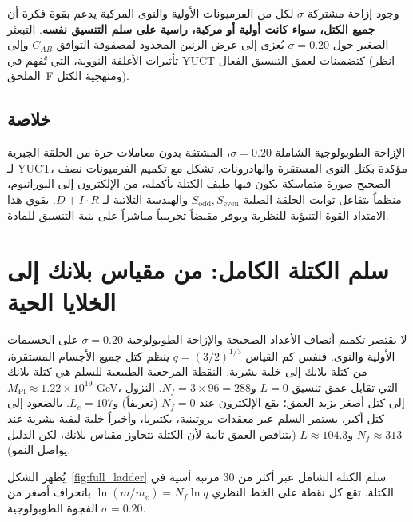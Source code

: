 \documentclass[12pt,a4paper]{article}
\begin{document}
	وجود إزاحة مشتركة \(\sigma\) لكل من الفرميونات الأولية والنوى المركبة يدعم بقوة فكرة أن \textbf{جميع الكتل، سواء كانت أولية أو مركبة، راسية على سلم التنسيق نفسه}. التبعثر الصغير حول \(\sigma=0.20\) يُعزى إلى عرض الرنين المحدود لمصفوفة التوافق \(C_{AB}\) وإلى تأثيرات الأغلفة النووية، التي تُفهم في YUCT كتضمينات لعمق التنسيق الفعال (انظر الملحق~F ومنهجية الكتل).
	
	\subsection{خلاصة}
	الإزاحة الطوبولوجية الشاملة \(\sigma = 0.20\)، المشتقة بدون معاملات حرة من الحلقة الجبرية لـ YUCT، مؤكدة بكتل النوى المستقرة والهادرونات. تشكل مع تكميم الفرميونات نصف الصحيح صورة متماسكة يكون فيها طيف الكتلة بأكمله، من الإلكترون إلى اليورانيوم، منظماً بتفاعل ثوابت الحلقة الصلبة \(S_{\mathrm{odd}}, S_{\mathrm{even}}\) والهندسة الثلاثية لـ \(D+I\cdot R\). يقوي هذا الامتداد القوة التنبؤية للنظرية ويوفر مقبضاً تجريبياً مباشراً على بنية التنسيق للمادة.
	
	\section{سلم الكتلة الكامل: من مقياس بلانك إلى الخلايا الحية}
	\label{sec:complete_ladder}
	
	لا يقتصر تكميم أنصاف الأعداد الصحيحة والإزاحة الطوبولوجية \(\sigma = 0.20\) على الجسيمات الأولية والنوى. فنفس كم القياس \(q = (3/2)^{1/3}\) ينظم كتل جميع الأجسام المستقرة، من كتلة بلانك إلى خلية بشرية. النقطة المرجعية الطبيعية للسلم هي كتلة بلانك \(M_{\mathrm{Pl}} \approx 1.22 \times 10^{19}\) GeV، التي تقابل عمق تنسيق \(L = 0\) و\(N_f = 3 \times 96 = 288\). النزول إلى كتل أصغر يزيد العمق؛ يقع الإلكترون عند \(N_f = 0\) (تعريفاً) و\(L_e = 107\). بالصعود إلى كتل أكبر، يستمر السلم عبر معقدات بروتينية، بكتيريا، وأخيراً خلية ليفية بشرية عند \(N_f \approx 313\) و\(L \approx 104.3\) (يتناقص العمق ثانية لأن الكتلة تتجاوز مقياس بلانك، لكن الدليل يواصل النمو).
	
	يُظهر الشكل~\ref{fig:full_ladder} سلم الكتلة الشامل عبر أكثر من 30 مرتبة أسية في الكتلة. تقع كل نقطة على الخط النظري \(\ln(m/m_e) = N_f \ln q\) بانحراف أصغر من الفجوة الطوبولوجية \(\sigma = 0.20\).
	
\end{document}
